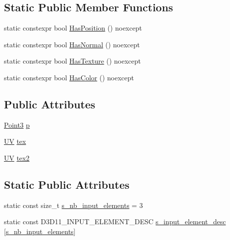 \subsection*{Static Public Member Functions}
\begin{DoxyCompactItemize}
\item 
static constexpr bool \hyperlink{structmage_1_1_vertex_position_texture_texture_ae89995d8e461d3ee461cd55ce214c749}{Has\+Position} () noexcept
\item 
static constexpr bool \hyperlink{structmage_1_1_vertex_position_texture_texture_ae61b4c7a1b5efeb6894c910202f8b246}{Has\+Normal} () noexcept
\item 
static constexpr bool \hyperlink{structmage_1_1_vertex_position_texture_texture_ad43aac95c2d0c120e2e5120553c4eadc}{Has\+Texture} () noexcept
\item 
static constexpr bool \hyperlink{structmage_1_1_vertex_position_texture_texture_a7909db2966b9c3bab061a4bd22868019}{Has\+Color} () noexcept
\end{DoxyCompactItemize}
\subsection*{Public Attributes}
\begin{DoxyCompactItemize}
\item 
\hyperlink{structmage_1_1_point3}{Point3} \hyperlink{structmage_1_1_vertex_position_texture_texture_aed106149eda65a20e60ebc3b93535270}{p}
\item 
\hyperlink{structmage_1_1_u_v}{UV} \hyperlink{structmage_1_1_vertex_position_texture_texture_ae47656414d503a2c96c88fa6d485cccf}{tex}
\item 
\hyperlink{structmage_1_1_u_v}{UV} \hyperlink{structmage_1_1_vertex_position_texture_texture_a5a41669f18385d932c1490ff20c80bed}{tex2}
\end{DoxyCompactItemize}
\subsection*{Static Public Attributes}
\begin{DoxyCompactItemize}
\item 
static const size\+\_\+t \hyperlink{structmage_1_1_vertex_position_texture_texture_ab045a99425860b68ac9fc27e44edf4cf}{s\+\_\+nb\+\_\+input\+\_\+elements} = 3
\item 
static const D3\+D11\+\_\+\+I\+N\+P\+U\+T\+\_\+\+E\+L\+E\+M\+E\+N\+T\+\_\+\+D\+E\+SC \hyperlink{structmage_1_1_vertex_position_texture_texture_aa3d92b247687789245ed11e719ba2421}{s\+\_\+input\+\_\+element\+\_\+desc} \mbox{[}\hyperlink{structmage_1_1_vertex_position_texture_texture_ab045a99425860b68ac9fc27e44edf4cf}{s\+\_\+nb\+\_\+input\+\_\+elements}\mbox{]}
\end{DoxyCompactItemize}


